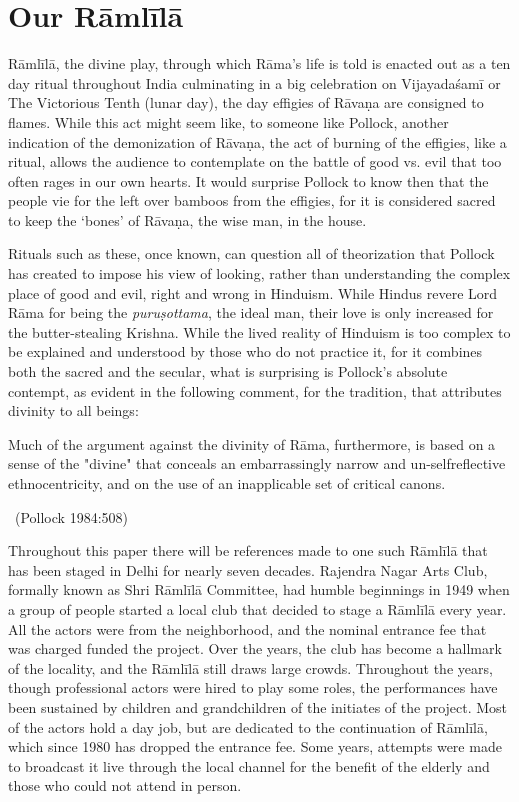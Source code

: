 \section*{Our Rāmlīlā}

Rāmlīlā, the divine play, through which Rāma’s life is told is enacted out as a ten day ritual throughout India culminating in a big celebration on Vijayadaśamī or The Victorious Tenth (lunar day), the day effigies of Rāvaṇa are consigned to flames. While this act might seem like, to someone like Pollock, another indication of the demonization of Rāvaṇa, the act of burning of the effigies, like a ritual, allows the audience to contemplate on the battle of good vs. evil that too often rages in our own hearts. It would surprise Pollock to know then that the people vie for the left over bamboos from the effigies, for it is considered sacred to keep the ‘bones’ of Rāvaṇa, the wise man, in the house.

Rituals such as these, once known, can question all of theorization that Pollock has created to impose his view of looking, rather than understanding the complex place of good and evil, right and wrong in Hinduism. While Hindus revere Lord Rāma for being the \textit{puruṣottama}, the ideal man, their love is only increased for the butter-stealing Krishna. While the lived reality of Hinduism is too complex to be explained and understood by those who do not practice it, for it combines both the sacred and the secular, what is surprising is Pollock’s absolute contempt, as evident in the following comment, for the tradition, that attributes divinity to all beings:

\begin{myquote}
Much of the argument against the divinity of Rāma, furthermore, is based on a sense of the "divine" that conceals an embarrassingly narrow and un-selfreflective ethnocentricity, and on the use of an inapplicable set of critical canons. 

~\hfill (Pollock 1984:508)
\end{myquote}

Throughout this paper there will be references made to one such Rāmlīlā that has been staged in Delhi for nearly seven decades. Rajendra Nagar Arts Club, formally known as Shri Rāmlīlā Committee, had humble beginnings in 1949 when a group of people started a local club that decided to stage a Rāmlīlā every year. All the actors were from the neighborhood, and the nominal entrance fee that was charged funded the project. Over the years, the club has become a hallmark of the locality, and the Rāmlīlā still draws large crowds. Throughout the years, though professional actors were hired to play some roles, the performances have been sustained by children and grandchildren of the initiates of the project. Most of the actors hold a day job, but are dedicated to the continuation of Rāmlīlā, which since 1980 has dropped the entrance fee. Some years, attempts were made to broadcast it live through the local channel for the benefit of the elderly and those who could not attend in person.

